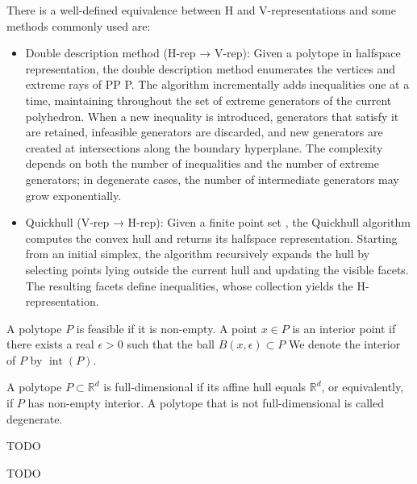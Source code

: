 There is a well-defined equivalence between H and V-representations and some methods commonly used are:
\begin{itemize}
    \item Double description method (H-rep → V-rep):
    Given a polytope in halfspace representation, the double description method enumerates the vertices and extreme rays of PP
    P. The algorithm incrementally adds inequalities one at a time, maintaining throughout the set of extreme generators of the current polyhedron. When a new inequality is introduced, generators that satisfy it are retained, infeasible generators are discarded, and new generators are created at intersections along the boundary hyperplane. The complexity depends on both the number of inequalities and the number of extreme generators; in degenerate cases, the number of intermediate generators may grow exponentially.
    \item Quickhull (V-rep → H-rep):
    Given a finite point set , the Quickhull algorithm computes the convex hull and returns its halfspace representation. Starting from an initial simplex, the algorithm recursively expands the hull by selecting points lying outside the current hull and updating the visible facets. The resulting facets define inequalities, whose collection yields the H-representation.
\end{itemize}

\begin{definition}
A polytope $P$ is feasible if it is non-empty. A point $x \in P$ is an interior point if there exists a real $\epsilon > 0$ such that the ball $B(x,\epsilon) \subset P$ We denote the interior of $P$ by $\operatorname{int}(P)$.
\end{definition}

\begin{definition}
A polytope $P\subset \mathbb{R}^d$ is full-dimensional if its affine hull equals $\mathbb{R}^d$, or equivalently, if $P$ has non-empty interior. A polytope that is not full-dimensional is called degenerate.
\end{definition}



\begin{definition}
TODO
\end{definition}

\begin{definition}[Diameter]
TODO
\end{definition}


